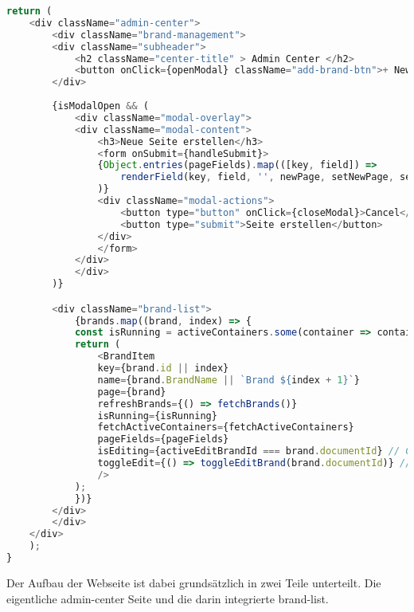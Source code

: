 \begin{lstlisting}[language=JavaScript, caption={AdminCenter.jsx Aufbau}, label={lst:admincenterjsxAufbau}]
return (
    <div className="admin-center">
        <div className="brand-management">
        <div className="subheader">
            <h2 className="center-title" > Admin Center </h2>
            <button onClick={openModal} className="add-brand-btn">+ New Page</button>
        </div>
        
        {isModalOpen && (
            <div className="modal-overlay">
            <div className="modal-content">
                <h3>Neue Seite erstellen</h3>
                <form onSubmit={handleSubmit}>
                {Object.entries(pageFields).map(([key, field]) => 
                    renderField(key, field, '', newPage, setNewPage, setError)
                )}
                <div className="modal-actions">
                    <button type="button" onClick={closeModal}>Cancel</button>
                    <button type="submit">Seite erstellen</button>
                </div>
                </form>
            </div>
            </div>
        )}

        <div className="brand-list">
            {brands.map((brand, index) => {
            const isRunning = activeContainers.some(container => container.name === `subbrand-${brand.documentId}`);
            return (
                <BrandItem
                key={brand.id || index}
                name={brand.BrandName || `Brand ${index + 1}`}
                page={brand}
                refreshBrands={() => fetchBrands()}
                isRunning={isRunning}
                fetchActiveContainers={fetchActiveContainers}
                pageFields={pageFields}
                isEditing={activeEditBrandId === brand.documentId} // Check if this brand is being edited
                toggleEdit={() => toggleEditBrand(brand.documentId)} // Toggle edit mode
                />
            );
            })}
        </div>
        </div>
    </div>
    );
}
\end{lstlisting}

Der Aufbau der Webseite ist dabei grundsätzlich in zwei Teile unterteilt. Die eigentliche admin-center Seite und die darin integrierte brand-list.